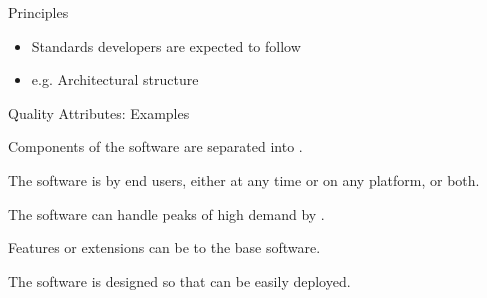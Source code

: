 \documentclass{slide}
\begin{document}
\begin{frame}{Principles}

\Large{
\begin{itemize}
    \item Standards developers are expected to follow
	\vspace{0.3em}
    \item e.g. Architectural structure
\end{itemize}
}

\end{frame}



\begin{frame}{Quality Attributes: Examples}

\large{
\begin{description}[<+->]
    \setlength\itemsep{0.35em}
    \item[Modularity] Components of the software are separated into .
    \item[Availability] The software is  by end users, either at any time or on any platform, or both.
    \item[Scalability] The software can handle peaks of high demand by .
    \item[Extensibility] Features or extensions can be  to the base software.
    \item[Testibility] The software is designed so that  can be easily deployed.
\end{description}
}

\end{frame}
\end{document}
